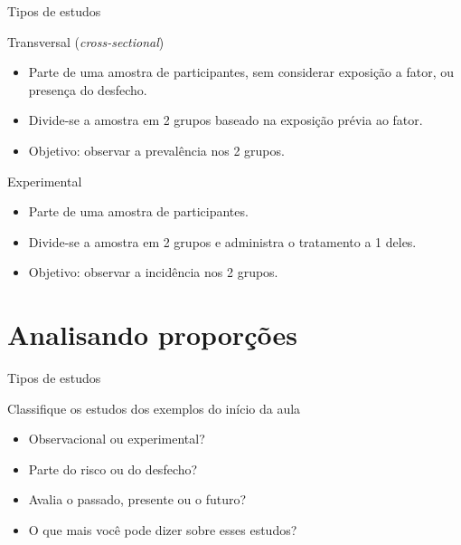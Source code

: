 \documentclass{beamer}
\begin{document}
\begin{frame}{Tipos de estudos}
  \begin{block}{Transversal ({\em cross-sectional})}
    \begin{itemize}
    \item Parte de uma amostra de participantes, sem considerar exposição a fator, ou presença do desfecho.
    \item Divide-se a amostra em 2 grupos baseado na exposição prévia ao fator.
    \item Objetivo: observar a prevalência nos 2 grupos.
    \end{itemize}
  \end{block}
  \begin{block}{Experimental}
    \begin{itemize}
    \item Parte de uma amostra de participantes.
    \item Divide-se a amostra em 2 grupos e administra o tratamento a 1 deles.
    \item Objetivo: observar a incidência nos 2 grupos.
    \end{itemize}
  \end{block}
\end{frame}

\section{Analisando proporções}

\begin{frame}{Tipos de estudos}
  \begin{block}{}
    Classifique os estudos dos exemplos do início da aula

    \begin{itemize}
    \item Observacional ou experimental?
    \item Parte do risco ou do desfecho?
    \item Avalia o passado, presente ou o futuro?
    \item O que mais você pode dizer sobre esses estudos?
    \end{itemize}
  \end{block}
\end{frame}


\end{document}
